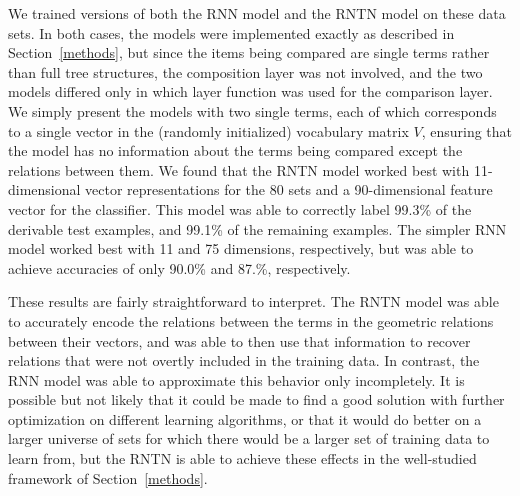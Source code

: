 We trained versions of both the RNN model and the RNTN model on these
data sets. In both cases, the models were implemented exactly as
described in Section~\ref{methods}, but since the items being compared
are single terms rather than full tree structures, the composition
layer was not involved, and the two models differed only in which
layer function was used for the comparison layer. We simply present
the models with two single terms, each of which corresponds to a
single vector in the (randomly initialized) vocabulary matrix $V$,
ensuring that the model has no information about the terms being
compared except the relations between them. We found that the RNTN
model worked best with 11-dimensional vector representations for the
80 sets and a 90-dimensional feature vector for the classifier. This
model was able to correctly label 99.3\% of the derivable test
examples, and 99.1\% of the remaining examples. The simpler RNN model
worked best with 11 and 75 dimensions, respectively, but was able to
achieve accuracies of only 90.0\% and 87.\%, respectively.




These results are fairly straightforward to interpret. The RNTN model
was able to accurately encode the relations between the terms in the
geometric relations between their vectors, and was able to then use
that information to recover relations that were not overtly included
in the training data. In contrast, the RNN model was able to
approximate this behavior only incompletely. It is possible but not
likely that it could be made to find a good solution with further
optimization on different learning algorithms, or that it would do
better on a larger universe of sets for which there would be a larger
set of training data to learn from, but the RNTN is able to achieve
these effects in the well-studied framework of Section~\ref{methods}.

